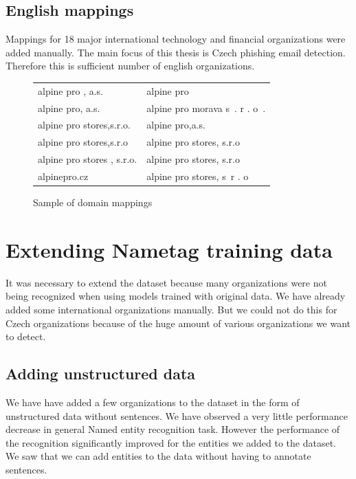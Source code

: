 \documentclass[thesis=B,english]{FITthesis}[2012/10/20]
\begin{document}
\subsection{English mappings}
Mappings for 18 major international technology and financial organizations were added manually.
The main focus of this thesis is Czech phishing email detection.
Therefore this is sufficient number of english organizations.

\begin{figure}[!ht]
    \centering
    \caption[Sample of domain mappings]{Sample of domain mappings\protect\footnotemark }
    \label{verb_mapping}
   \begin{tabular}{|l|l|}
   \hline
       alpine pro , a.s. & alpine pro \\ 
       alpine pro,  a.s. & alpine pro morava s~. r . o~. \\
       alpine pro stores,s.r.o. & alpine pro,a.s. \\
       alpine pro stores,s.r.o & alpine pro stores,  s.r.o   \\
       alpine pro stores , s.r.o.  & alpine pro stores, s.r.o \\
       alpinepro.cz & alpine pro stores, s~r . o~\\
    \hline
    \end{tabular}

\end{figure}

\section{Extending Nametag training data}
It was necessary to extend the dataset because many organizations were not being recognized when using models trained with original data. We have already added some international organizations manually. But we could not do this for Czech organizations because of the huge amount of various organizations we want to detect.

\subsection{Adding unstructured data}
We have have added a few organizations to the dataset in the form of unstructured data without sentences.
We have observed a very little performance decrease in general Named entity recognition task.
However the performance of the recognition significantly improved for the entities we added to the dataset.
We saw that we can add entities to the data without having to annotate sentences.
\end{document}
